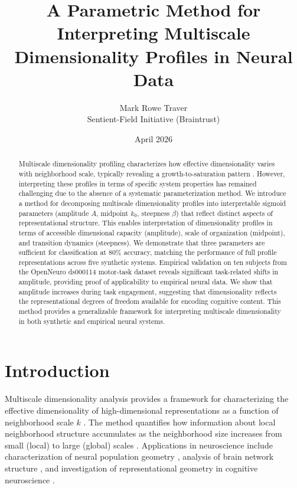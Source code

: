 \documentclass[11pt]{article}
\title{
A Parametric Method for Interpreting Multiscale Dimensionality Profiles in Neural Data
}
\author{
Mark Rowe Traver\\
Sentient-Field Initiative (Braintrust)
}
\date{April 2026}
\begin{document}
\maketitle

\begin{abstract}
	Multiscale dimensionality profiling characterizes how effective dimensionality varies with neighborhood scale, typically revealing a growth-to-saturation pattern \citep{gallego2017neural, stringer2019high}. However, interpreting these profiles in terms of specific system properties has remained challenging due to the absence of a systematic parameterization method. We introduce a method for decomposing multiscale dimensionality profiles into interpretable sigmoid parameters (amplitude $A$, midpoint $k_0$, steepness $\beta$) that reflect distinct aspects of representational structure. This enables interpretation of dimensionality profiles in terms of accessible dimensional capacity (amplitude), scale of organization (midpoint), and transition dynamics (steepness). We demonstrate that three parameters are sufficient for classification at 80\% accuracy, matching the performance of full profile representations across five synthetic systems. Empirical validation on ten subjects from the OpenNeuro ds000114 motor-task dataset reveals significant task-related shifts in amplitude, providing proof of applicability to empirical neural data. We show that amplitude increases during task engagement, suggesting that dimensionality reflects the representational degrees of freedom available for encoding cognitive content. This method provides a generalizable framework for interpreting multiscale dimensionality in both synthetic and empirical neural systems.
\end{abstract}

\section{Introduction}

Multiscale dimensionality analysis provides a framework for characterizing the effective dimensionality of high-dimensional representations as a function of neighborhood scale $k$ \citep{levina2005maximum, facco2017estimating}. The method quantifies how information about local neighborhood structure accumulates as the neighborhood size increases from small (local) to large (global) scales \citep{belkin2003laplacian, tenenbaum2000global}. Applications in neuroscience include characterization of neural population geometry \citep{gallego2017neural, castellani2020neural}, analysis of brain network structure \citep{squillante2020dimensionality}, and investigation of representational geometry in cognitive neuroscience \citep{kriegeskorte2008representational}.
\end{document}
